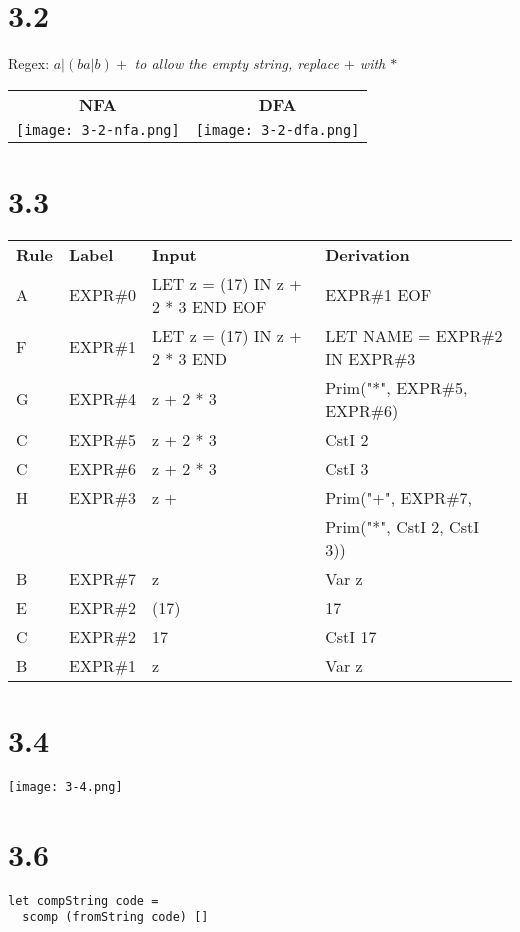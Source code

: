 \documentclass{article}
\begin{document}
\section*{3.2}

Regex: $a|(ba|b)+$
\newline\textit{to allow the empty string, replace $+$ with $*$}

\vspace{10 mm}

\begin{tabular}{c c}
\textbf{NFA} & \textbf{DFA} \\
\texttt{[image: 3-2-nfa.png]} &
	\texttt{[image: 3-2-dfa.png]}
\end{tabular}

\section*{3.3}

\begin{tabular}{l l l l}
\textbf{Rule} & \textbf{Label} & \textbf{Input} & \textbf{Derivation} \\
A & EXPR\#0 & LET z = (17) IN z + 2 * 3 END EOF & EXPR\#1 EOF \\
F & EXPR\#1 & LET z = (17) IN z + 2 * 3 END & LET NAME = EXPR\#2 IN EXPR\#3 \\
G & EXPR\#4 & z + 2 * 3 & Prim("*", EXPR\#5, EXPR\#6) \\
C & EXPR\#5 & z + 2 * 3 & CstI 2 \\
C & EXPR\#6 & z + 2 * 3 & CstI 3 \\
H & EXPR\#3 & z + & Prim("+", EXPR\#7, \\
  &         &     & \quad Prim("*", CstI 2, CstI 3)) \\
B & EXPR\#7 & z & Var z \\
E & EXPR\#2 & (17) & 17 \\
C & EXPR\#2 & 17 & CstI 17 \\
B & EXPR\#1 & z & Var z 
\end{tabular}

\section*{3.4}

\texttt{[image: 3-4.png]}

\section*{3.6}

\begin{verbatim}
let compString code = 
  scomp (fromString code) []
\end{verbatim}
\end{document}
